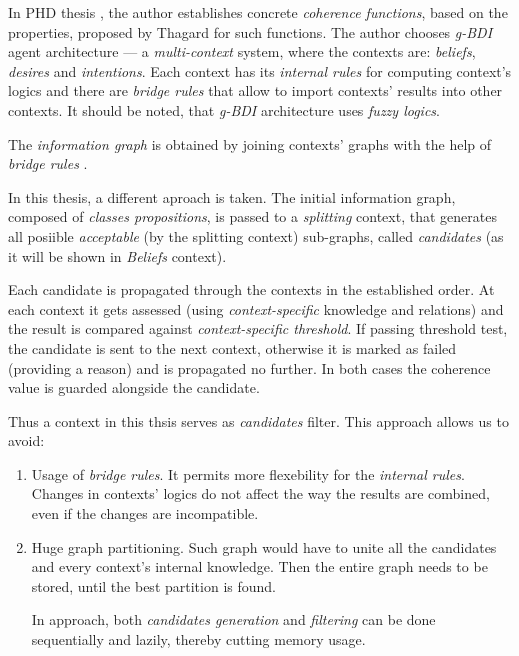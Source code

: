 In PHD thesis \cite{UAB-Thesis}, the author establishes concrete
\emph{coherence functions}, based on the properties, proposed by Thagard for
such functions. The author chooses \emph{g-BDI} agent architecture ---
a \emph{multi-context} system, where the contexts are: \emph{beliefs},
\emph{desires} and \emph{intentions}. Each context has its \emph{internal rules}
for computing context's logics and there are \emph{bridge rules} that allow to
import contexts' results into other contexts. It should be noted, that \emph{g-BDI}
architecture uses \emph{fuzzy logics}.

The \emph{information graph} is obtained by joining contexts' graphs with the
help of \emph{bridge rules}  \cite[62]{UAB-Thesis}.

\bigskip


\noindent
In this thesis, a different aproach is taken. The initial information graph,
composed of \emph{classes propositions}, is passed to a \emph{splitting} context,
that generates all posiible \emph{acceptable} (by the splitting context) sub-graphs,
called \emph{candidates} (as it will be shown in \emph{Beliefs} context).

Each candidate is propagated through the contexts in the established
order. At each context it gets assessed
(using \emph{context-specific} knowledge and relations)
and the result is compared against \emph{context-specific threshold}.
If passing threshold test,
the candidate is sent to the next context, otherwise it is marked as failed
(providing a reason) and is propagated no further. In both cases the coherence
value is guarded alongside the candidate.

Thus a context in this thsis serves as \emph{candidates} filter. This approach
allows us to avoid:
\begin{enumerate}
  \item Usage of \emph{bridge rules}. It permits more flexebility for
    the \emph{internal rules}. Changes in contexts' logics do not affect the way
    the results are combined, even if the changes are incompatible.
  \item Huge graph partitioning. Such graph would have to unite all the
    candidates and every context's internal knowledge. Then the entire graph
    needs to be stored, until the best partition is found.

    In  approach, both \emph{candidates generation} and
    \emph{filtering} can be done sequentially and lazily,
    thereby cutting memory usage.

\end{enumerate}

